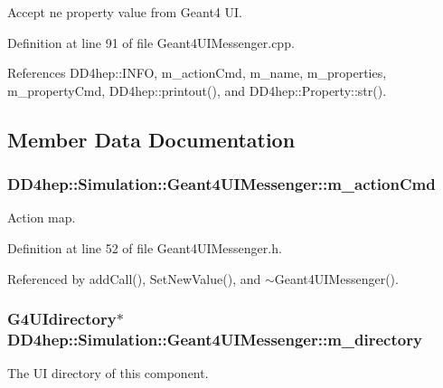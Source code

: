 Accept ne property value from Geant4 UI. 

Definition at line 91 of file Geant4UIMessenger.cpp.

References DD4hep::INFO, m\_\-actionCmd, m\_\-name, m\_\-properties, m\_\-propertyCmd, DD4hep::printout(), and DD4hep::Property::str().

\subsection{Member Data Documentation}
\hypertarget{class_d_d4hep_1_1_simulation_1_1_geant4_u_i_messenger_afb818b60e55fd0ccd83ec5f7b78eb82c}{
\subsubsection[{m\_\-actionCmd}]{ {\bf DD4hep::Simulation::Geant4UIMessenger::m\_\-actionCmd}}}
\label{class_d_d4hep_1_1_simulation_1_1_geant4_u_i_messenger_afb818b60e55fd0ccd83ec5f7b78eb82c}


Action map. 

Definition at line 52 of file Geant4UIMessenger.h.

Referenced by addCall(), SetNewValue(), and $\sim$Geant4UIMessenger().\hypertarget{class_d_d4hep_1_1_simulation_1_1_geant4_u_i_messenger_a6774d3061088d7b9391770e8dc74385e}{
\subsubsection[{m\_\-directory}]{\setlength{\rightskip}{0pt plus 5cm}G4UIdirectory$\ast$ {\bf DD4hep::Simulation::Geant4UIMessenger::m\_\-directory}}}
\label{class_d_d4hep_1_1_simulation_1_1_geant4_u_i_messenger_a6774d3061088d7b9391770e8dc74385e}


The UI directory of this component. 

